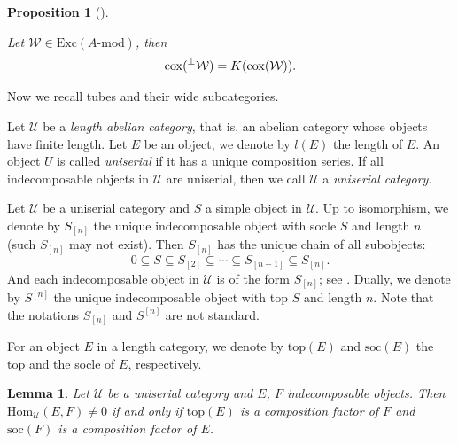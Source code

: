 \documentclass[a4paper, 11pt, reqno]{amsart}
\numberwithin{equation}{section}
\newtheorem{lem}[thm]{Lemma}
\newtheorem{prop}[thm]{Proposition}
\theoremstyle{remark}
\theoremstyle{definition}
\begin{document}
\begin{prop} [{\cite[Proposition 6.1]{hubery2016categorification}}] \label{Kreweras in cat} 

   Let $\mathcal W \in \mathrm{Exc}(A \text{-} \mathrm{mod})$, then 
   \[
     \mathrm{cox}(\prescript{\perp}{}{\mathcal W})=K(\mathrm{cox}(\mathcal W)).
   \]
\end{prop}

Now we recall tubes and their wide subcategories. 

Let $\mathcal U$ be a \emph{length abelian category}, that is, an abelian category whose objects have finite length. Let $E$ be an object, we denote by $l(E)$ the length of $E$. An object $U$ is called \emph{uniserial} if it has a unique composition series. If all indecomposable objects in $\mathcal U$ are uniserial, then we call $\mathcal U$ a \emph{uniserial category}.

Let $\mathcal U$ be a uniserial category and $S$ a simple object in $\mathcal U$. Up to isomorphism, we denote by $S_{[n]}$ the unique indecomposable object with socle $S$ and length $n$ (such $S_{[n]}$ may not exist). Then $S_{[n]}$ has the unique chain of all subobjects:
\[
0 \subseteq S \subseteq S_{[2]} \subseteq \cdots \subseteq S_{[n-1]} \subseteq S_{[n]}.
\]
And each indecomposable object in $\mathcal U$ is of the form $S_{[n]}$; see \cite[Subsection~1.7]{chen2009introduction}. Dually, we denote by $S^{[n]}$ the unique indecomposable object with top $S$ and length $n$. Note that the notations $S_{[n]}$ and $S^{[n]}$ are not standard.

For an object $E$ in a length category, we denote by $\mathrm{top}(E)$ and $\mathrm{soc}(E)$ the top and the socle of $E$, respectively. 

\begin{lem} \label{uni_hom}
   Let $\mathcal U$ be a uniserial category and $E$, $F$ indecomposable objects. Then $\mathrm{Hom}_{\mathcal U}(E,F) \neq 0$ if and only if $\mathrm{top}(E)$ is a composition factor of $F$ and $\mathrm{soc}(F)$ is a composition factor of $E$.
\end{lem}
   
\end{document}
